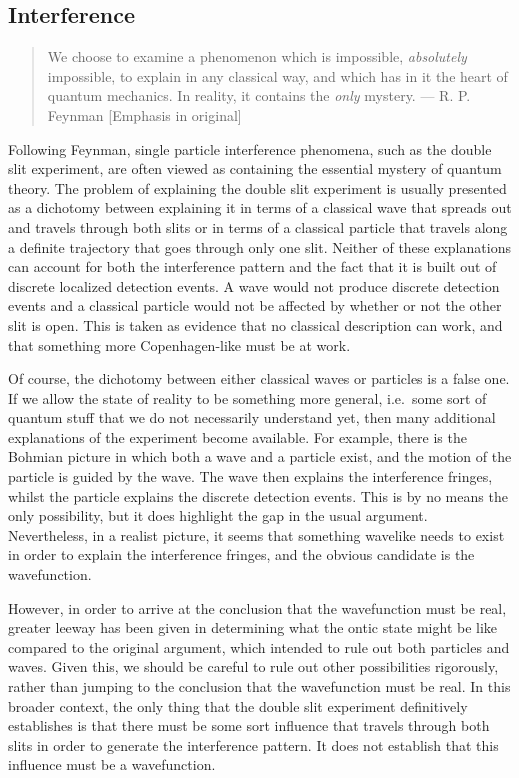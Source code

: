 \documentclass[DIV=calc,paper=a4,fontsize=11pt,twocolumn]{scrartcl} %
\theoremstyle{definition}
\theoremstyle{plain}
\begin{document}
\subsection{Interference}

\label{Int}

\begin{quote}
We choose to examine a phenomenon which is impossible,
\emph{absolutely} impossible, to explain in any classical way, and
which has in it the heart of quantum mechanics.  In reality, it
contains the \emph{only} mystery. --- R. P. Feynman
\cite{Feynman2010} [Emphasis in original]
\end{quote}

Following Feynman, single particle interference phenomena, such as the
double slit experiment, are often viewed as containing the essential
mystery of quantum theory.  The problem of explaining the double slit
experiment is usually presented as a dichotomy between explaining it
in terms of a classical wave that spreads out and travels through both
slits or in terms of a classical particle that travels along a
definite trajectory that goes through only one slit.  Neither of these
explanations can account for both the interference pattern and the
fact that it is built out of discrete localized detection events.  A
wave would not produce discrete detection events and a classical
particle would not be affected by whether or not the other slit is
open.  This is taken as evidence that no classical description can
work, and that something more Copenhagen-like must be at work.

Of course, the dichotomy between either classical waves or particles
is a false one.  If we allow the state of reality to be something more
general, i.e.\ some sort of quantum stuff that we do not necessarily
understand yet, then many additional explanations of the experiment
become available.  For example, there is the Bohmian picture in which
both a wave and a particle exist, and the motion of the particle is
guided by the wave.  The wave then explains the interference fringes,
whilst the particle explains the discrete detection events.  This is
by no means the only possibility, but it does highlight the gap in the
usual argument.  Nevertheless, in a realist picture, it seems that
something wavelike needs to exist in order to explain the interference
fringes, and the obvious candidate is the wavefunction.

However, in order to arrive at the conclusion that the wavefunction
must be real, greater leeway has been given in determining what the
ontic state might be like compared to the original argument, which
intended to rule out both particles and waves.  Given this, we should
be careful to rule out other possibilities rigorously, rather than
jumping to the conclusion that the wavefunction must be real.  In this
broader context, the only thing that the double slit experiment
definitively establishes is that there must be some sort influence
that travels through both slits in order to generate the interference
pattern.  It does not establish that this influence must be a
wavefunction.
\end{document}
